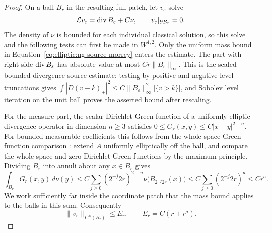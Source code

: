 \begin{proof}
On a ball $B_r$ in the resulting full patch, let $v_\varepsilon$ solve
\begin{equation}\label{eq:elliptic:ng-potential}
 \mathcal L v_\varepsilon=\operatorname{div} B_\varepsilon+C\nu,
 \qquad v_\varepsilon|_{\partial B_r}=0.
\end{equation}
The density of $\nu$ is bounded for each individual classical solution,
so this solve and the following tests can first be made in $W^{1,2}$.
Only the uniform mass bound in Equation~\eqref{eq:elliptic:ng-source-morrey} enters the
estimate.  The part with right side $\operatorname{div} B_\varepsilon$ has absolute
value at most $Cr\|B_\varepsilon\|_\infty$.  This is the scaled
bounded-divergence-source estimate: testing by positive and negative
level truncations gives
$\int|D(v-k)_+|^2\le C\|B_\varepsilon\|_\infty^2
 |\{v>k\}|$, and Sobolev level iteration on the unit ball proves
the asserted bound after rescaling.

For the measure part, the scalar Dirichlet Green function of a
uniformly elliptic divergence operator in dimension $n\ge3$ satisfies
$0\le G_r(x,y)\le C|x-y|^{2-n}$.  For bounded measurable coefficients this follows from the
whole-space Green-function comparison
\cite[Section~7]{LittmanStampacchiaWeinberger1963}: extend $A$
uniformly elliptically off the ball, and compare the whole-space
and zero-Dirichlet Green functions by the maximum principle.  Dividing $B_r$ into annuli about any $x\in B_r$ gives
\[
 \int_{B_r}G_r(x,y)\,d\nu(y)
 \le C\sum_{j\ge0}(2^{-j}2r)^{2-n}
                   \nu\bigl(B_{2^{-j}2r}(x)\bigr)
 \le C\sum_{j\ge0}(2^{-j}2r)^a\le Cr^a.
\]
We work sufficiently far inside the coordinate patch that the mass
bound applies to the balls in this sum.  Consequently
\begin{equation}\label{eq:elliptic:ng-potential-bound}
 \|v_\varepsilon\|_{L^\infty(B_r)}\le E_r,
 \qquad E_r=C(r+r^a).
\end{equation}


\end{proof}
